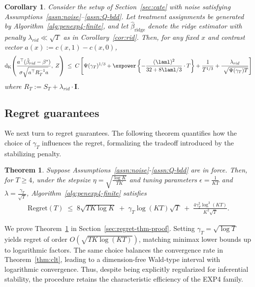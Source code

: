 \documentclass[11pt,letterpaper]{article}
\newcommand{\rpen}{\lambda_{rid}}
\newcommand{\Id}{\mathbf{I}}
\newcommand{\dist}{\operatorname{d}_{\operatorname{K}}}
\newcommand{\Regret}{\mathrm{Regret}}
\theoremstyle{plain}
\newtheorem{theorem}{Theorem}
\newtheorem{corollary}{Corollary}
\theoremstyle{definition}  %
\begin{document}
\begin{corollary}
\label{cor:cate}
Consider the setup of Section~\ref{sec:cate}
with noise satisfying Assumptions~\ref{assn:noise}--\ref{assn:Q-bdd}. Let treatment
assignments be generated by Algorithm~\ref{alg:penexp4-finite}, and let
$\widehat{\beta}_{\mathrm{ridge}}$ denote the ridge estimator with penalty
$\rpen \ll \sqrt{T}$ as in Corollary~\ref{cor:rid}. Then, for any fixed $x$ and contrast vector $a(x) := c(x,1) - c(x,0)$,
\begin{align*}
\dist\!\left(
        \frac{a^{\top}(\hat{\beta}_{rid} - \beta^\star)}
             {\sigma \sqrt{a^\top R_T^{-1} a}},\;
        Z
    \right)
   \;\leq\; C \left[
     \Psi(\gamma_T)^{1/3}  + \expower\left\{ - \frac{(\laml)^2}{32 +  8\laml/3} \cdot  T\right\} + \frac{1}{T^{1/3}}
    + \frac{\rpen}{ \ \sqrt{\Psi(\gamma_T) T}} \right] 
\end{align*}
where $R_T := S_T + \rpen \cdot \Id$.
\end{corollary}



\subsection{Regret guarantees}

We next turn to regret guarantees. The following theorem quantifies how the choice of $\gamma_T$ influences the regret, formalizing the tradeoff introduced by the stabilizing penalty. 

\begin{theorem}
\label{thm:regret}
Suppose Assumptions~\ref{assn:noise}-\ref{assn:Q-bdd} are in force. Then, 
for $T \ge 4$, under the stepsize 
$\eta = \sqrt{\frac{\log K}{T K}}$
and tuning parameters
$\epsilon = \frac{1}{KT}$ and $\lambda = \frac{\gamma_T}{\sqrt{T}}$,
Algorithm~\ref{alg:penexp4-finite} satisfies
\begin{align}
    \Regret(T)
    \;\le\;
    8\sqrt{T K \log K}
    \;+\;
    \gamma_T \log(KT)\sqrt{T}
    \;+\;
    \frac{4 \gamma_T^2 \log^3(KT)}{K^2 \sqrt{T}}.
    \label{eq:regret-bound}
\end{align}
\end{theorem}

\noindent 
We prove Theorem~\ref{thm:regret} in Section~\ref{sec:regret-thm-proof}.
Setting $\gamma_T = \sqrt{\log T}$ yields regret of order 
$O\!\left(\sqrt{T K \log(KT)}\right)$, matching minimax lower bounds up to
logarithmic factors. The same choice balances the convergence rate in 
Theorem~\ref{thm:clt}, leading to a dimension-free Wald-type interval with 
logarithmic convergence. Thus, despite being explicitly regularized for 
inferential stability, the procedure retains the characteristic efficiency of 
the EXP4 family.
\end{document}
